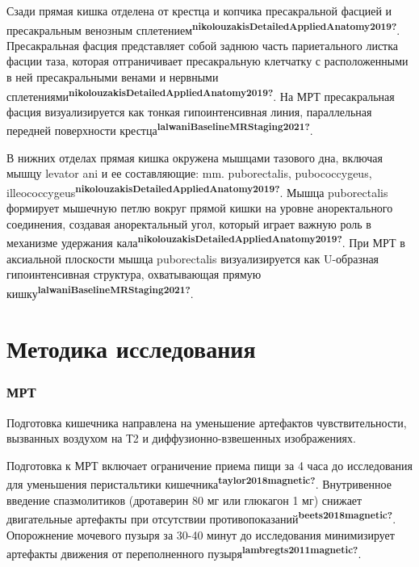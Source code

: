 \documentclass[
  russian,
  12pt,
  a4paper,
]{report}
\begin{document}
Сзади прямая кишка отделена от крестца и копчика пресакральной фасцией и
пресакральным венозным
сплетением\textsuperscript{\textbf{nikolouzakisDetailedAppliedAnatomy2019?}}.
Пресакральная фасция представляет собой заднюю часть париетального
листка фасции таза, которая отграничивает пресакральную клетчатку с
расположенными в ней пресакральными венами и нервными
сплетениями\textsuperscript{\textbf{nikolouzakisDetailedAppliedAnatomy2019?}}.
На МРТ пресакральная фасция визуализируется как тонкая гипоинтенсивная
линия, параллельная передней поверхности
крестца\textsuperscript{\textbf{lalwaniBaselineMRStaging2021?}}.

В нижних отделах прямая кишка окружена мышцами тазового дна, включая
мышцу levator ani и ее составляющие: mm. puborectalis, pubococcygeus,
illeococcygeus\textsuperscript{\textbf{nikolouzakisDetailedAppliedAnatomy2019?}}.
Мышца puborectalis формирует мышечную петлю вокруг прямой кишки на
уровне аноректального соединения, создавая аноректальный угол, который
играет важную роль в механизме удержания
кала\textsuperscript{\textbf{nikolouzakisDetailedAppliedAnatomy2019?}}.
При МРТ в аксиальной плоскости мышца puborectalis визуализируется как
U-образная гипоинтенсивная структура, охватывающая прямую
кишку\textsuperscript{\textbf{lalwaniBaselineMRStaging2021?}}.

\chapter{Методика
исследования}\label{ux43cux435ux442ux43eux434ux438ux43aux430-ux438ux441ux441ux43bux435ux434ux43eux432ux430ux43dux438ux44f}

\subsection{МРТ}\label{ux43cux440ux442}

Подготовка кишечника направлена на уменьшение артефактов
чувствительности, вызванных воздухом на Т2 и диффузионно-взвешенных
изображениях.

Подготовка к МРТ включает ограничение приема пищи за 4 часа до
исследования для уменьшения перистальтики
кишечника\textsuperscript{\textbf{taylor2018magnetic?}}. Внутривенное
введение спазмолитиков (дротаверин 80 мг или глюкагон 1 мг) снижает
двигательные артефакты при отсутствии
противопоказаний\textsuperscript{\textbf{beets2018magnetic?}}.
Опорожнение мочевого пузыря за 30-40 минут до исследования минимизирует
артефакты движения от переполненного
пузыря\textsuperscript{\textbf{lambregts2011magnetic?}}.
\end{document}
